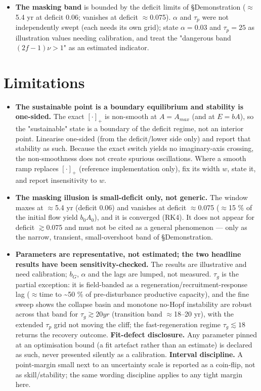 \documentclass[11pt]{article}
\begin{document}
\begin{itemize}
\item \textbf{The masking band} is bounded by the deficit limits of §Demonstration (\ensuremath{\approx{}}5.4 yr at deficit 0.06; vanishes at deficit \ensuremath{\approx{}}0.075). $\alpha{}$ and $\tau{}_{p}$ were not independently swept (each needs its own grid); state $\alpha{} = 0.03$ and $\tau{}_{p} = 25$ as illustration values needing calibration, and treat the "dangerous band $(2f-1)\nu{} > 1$" as an estimated indicator.
\end{itemize}

\section{Limitations}

\begin{itemize}
\item \textbf{The sustainable point is a boundary equilibrium and stability is one-sided.} The exact $[\cdot{}]_{+}$ is non-smooth at $A = A_{max}$ (and at $E = bA$), so the "sustainable" state is a boundary of the deficit regime, not an interior point. Linearise one-sided (from the deficit/lower side only) and report that stability as such. Because the exact switch yields no imaginary-axis crossing, the non-smoothness does not create spurious oscillations. Where a smooth ramp replaces $[\cdot{}]_{+}$ (reference implementation only), fix its width $w$, state it, and report insensitivity to $w$.
\item \textbf{The masking illusion is small-deficit only, not generic.} The window maxes at \ensuremath{\approx{}}5.4 yr (deficit 0.06) and vanishes at deficit \ensuremath{\approx{}}0.075 (\ensuremath{\approx{}}15 \% of the initial flow yield $b_{0}A_{0}$), and it is converged (RK4). It does not appear for deficit \ensuremath{\gtrsim{}}0.075 and must not be cited as a general phenomenon — only as the narrow, transient, small-overshoot band of §Demonstration.
\item \textbf{Parameters are representative, not estimated; the two headline results have been sensitivity-checked.} The results are illustrative and need calibration; $b_{G}$, $\alpha{}$ and the lags are lumped, not measured. $\tau{}_{g}$ is the partial exception: it is field-banded as a regeneration/recruitment-response lag (\ensuremath{\approx{}}time to \~{}50 \% of pre-disturbance productive capacity), and the fine sweep shows the collapse basin and monotone no-Hopf instability are robust across that band for $\tau{}_{g} \gtrsim{} 20 yr$ (transition band \ensuremath{\approx{}}18–20 yr), with the extended $\tau{}_{p}$ grid not moving the cliff; the fast-regeneration regime $\tau{}_{g} \lesssim{} 18$ returns the recovery outcome. \textbf{Fit-defect disclosure.} Any parameter pinned at an optimisation bound (a fit artefact rather than an estimate) is declared as such, never presented silently as a calibration. \textbf{Interval discipline.} A point-margin small next to an uncertainty scale is reported as a coin-flip, not as skill/stability; the same wording discipline applies to any tight margin here.

\end{itemize}
\end{document}
